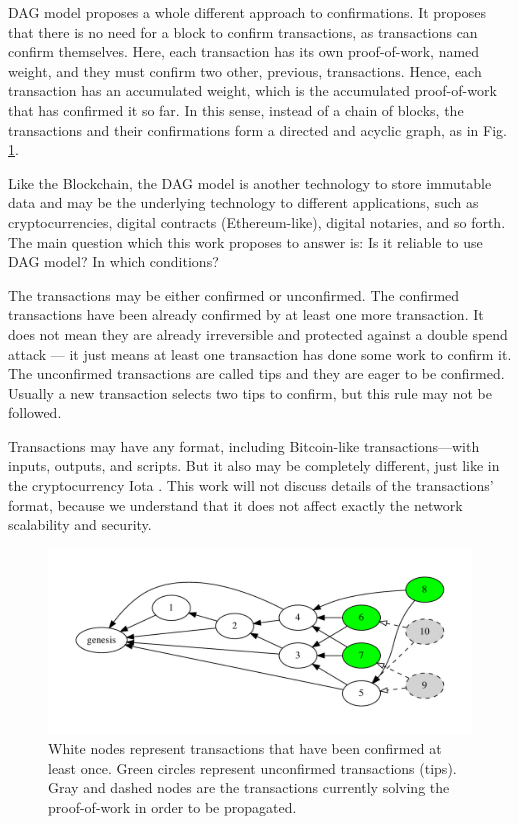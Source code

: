 DAG model proposes a whole different approach to confirmations. It proposes that there is no need for a block to confirm transactions, as transactions can confirm themselves. Here, each transaction has its own proof-of-work, named weight, and they must confirm two other, previous, transactions. Hence, each transaction has an accumulated weight, which is the accumulated proof-of-work that has confirmed it so far. In this sense, instead of a chain of blocks, the transactions and their confirmations form a directed and acyclic graph, as in Fig. \ref{fig-tangle-example}.

Like the Blockchain, the DAG model is another technology to store immutable data and may be the underlying technology to different applications, such as cryptocurrencies, digital contracts (Ethereum-like), digital notaries, and so forth. The main question which this work proposes to answer is: Is it reliable to use DAG model? In which conditions?

The transactions may be either confirmed or unconfirmed. The confirmed transactions have been already confirmed by at least one more transaction. It does not mean they are already irreversible and protected against a double spend attack --- it just means at least one transaction has done some work to confirm it. The unconfirmed transactions are called tips and they are eager to be confirmed. Usually a new transaction selects two tips to confirm, but this rule may not be followed.

Transactions may have any format, including Bitcoin-like transactions---with inputs, outputs, and scripts. But it also may be completely different, just like in the cryptocurrency Iota \citep{tangle2016}. This work will not discuss details of the transactions' format, because we understand that it does not affect exactly the network scalability and security.

\begin{figure}[ht]
\centering\includegraphics[width=\textwidth]{./images01/fig-tangle-example.pdf}
\caption{White nodes represent transactions that have been confirmed at least once. Green circles represent unconfirmed transactions (tips). Gray and dashed nodes are the transactions currently solving the proof-of-work in order to be propagated.\label{fig-tangle-example}}
\end{figure}

